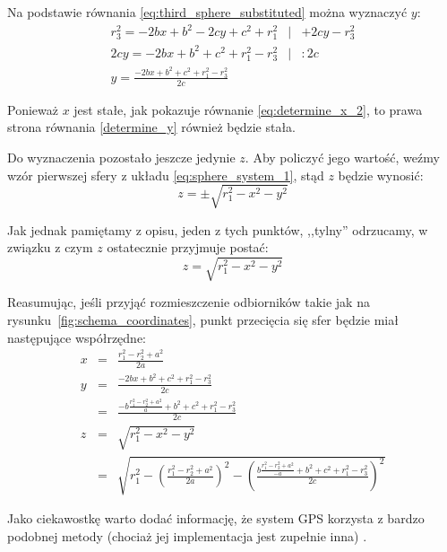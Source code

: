 Na podstawie równania \ref{eq:third_sphere_substituted} można wyznaczyć $y$:
\begin{eqnarray}
 r_3^2 = -2bx + b^2 - 2cy + c^2 + r_1^2 & | & +2cy - r_3^2 \\
 2cy   = -2bx + b^2 + c^2 + r_1^2 - r_3^2 & | & \colon 2c \\
 y     = \frac{-2bx + b^2 + c^2 + r_1^2 - r_3^2}{2c} & & \label{determine_y}
\end{eqnarray}

Ponieważ $x$ jest stałe, jak pokazuje równanie \ref{eq:determine_x_2}, to prawa strona równania \ref{determine_y} również będzie stała.

Do wyznaczenia pozostało jeszcze jedynie $z$. Aby policzyć jego wartość, weźmy wzór pierwszej sfery z układu \ref{eq:sphere_system_1}, stąd $z$ będzie wynosić:
\begin{equation}
 z = \pm\sqrt{r_1^2 - x^2 - y^2}
\end{equation}

Jak jednak pamiętamy z opisu, jeden z tych punktów, ,,tylny'' odrzucamy, w związku z czym $z$ ostatecznie przyjmuje postać:
\begin{equation}
 z = \sqrt{r_1^2 - x^2 - y^2}
\end{equation}

Reasumując, jeśli przyjąć rozmieszczenie odbiorników takie jak na rysunku~\ref{fig:schema_coordinates}, punkt przecięcia się sfer będzie miał następujące współrzędne:
\begin{eqnarray}
 x & = & \frac{r_1^2 - r_2^2 + a^2}{2a} \label{eq:trilateration_final_x}\\
 y & = & \frac{-2bx + b^2 + c^2 + r_1^2 - r_3^2}{2c} \label{eq:trilateration_final_y}\\
   & = & \frac{-b\frac{r_1^2 - r_2^2 + a^2}{a} + b^2 + c^2 + r_1^2 - r_3^2}{2c} \nonumber \\
 z & = & \sqrt{r_1^2 - x^2 - y^2} \label{eq:trilateration_final_z}\\
   & = & \sqrt{r_1^2 - \left(\frac{r_1^2 - r_2^2 + a^2}{2a}\right)^2 - \left(\frac{b\frac{r_1^2 - r_2^2 + a^2}{-a} + b^2 + c^2 + r_1^2 - r_3^2}{2c}\right)^2} \nonumber
\end{eqnarray}

Jako ciekawostkę warto dodać informację, że system \textsc{GPS} korzysta z bardzo podobnej metody (chociaż jej implementacja jest zupełnie inna) \citep{MioGps}.
